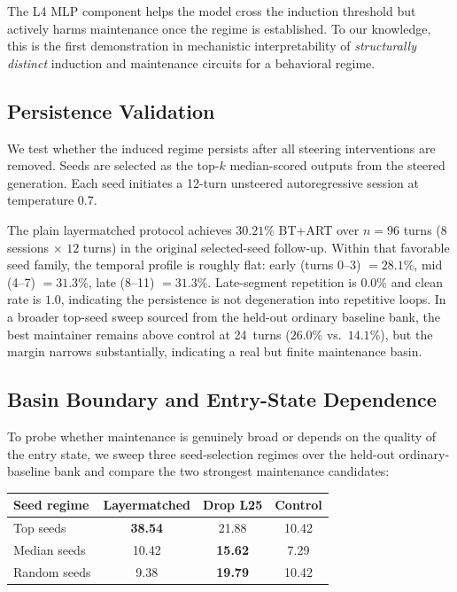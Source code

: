 \documentclass{article}
\begin{document}
The L4 MLP component helps the model cross the induction threshold but actively
harms maintenance once the regime is established.
To our knowledge, this is the first demonstration in mechanistic interpretability
of \emph{structurally distinct} induction and maintenance circuits for a behavioral regime.

\subsection{Persistence Validation}

We test whether the induced regime persists after all steering interventions are removed.
Seeds are selected as the top-$k$ median-scored outputs from the steered generation.
Each seed initiates a 12-turn unsteered autoregressive session at temperature 0.7.

The plain layermatched protocol achieves $30.21\%$ BT+ART over $n{=}96$ turns
($8$ sessions $\times$ $12$ turns) in the original selected-seed follow-up.
Within that favorable seed family, the temporal profile is roughly flat:
early (turns 0--3) $= 28.1\%$, mid (4--7) $= 31.3\%$, late (8--11) $= 31.3\%$.
Late-segment repetition is $0.0\%$ and clean rate is $1.0$, indicating the persistence
is not degeneration into repetitive loops.
In a broader top-seed sweep sourced from the held-out ordinary baseline bank,
the best maintainer remains above control at 24~turns ($26.0\%$ vs.\ $14.1\%$),
but the margin narrows substantially, indicating a real but finite maintenance basin.

\subsection{Basin Boundary and Entry-State Dependence}

To probe whether maintenance is genuinely broad or depends on the quality of the
entry state, we sweep three seed-selection regimes over the held-out ordinary-baseline
bank and compare the two strongest maintenance candidates:

\begin{center}
\small
\begin{tabular}{lccc}
\toprule
\textbf{Seed regime} & \textbf{Layermatched} & \textbf{Drop L25} & \textbf{Control} \\
\midrule
Top seeds & \textbf{38.54} & 21.88 & 10.42 \\
Median seeds & 10.42 & \textbf{15.62} & 7.29 \\
Random seeds & 9.38 & \textbf{19.79} & 10.42 \\
\bottomrule
\end{tabular}
\end{center}
\end{document}
